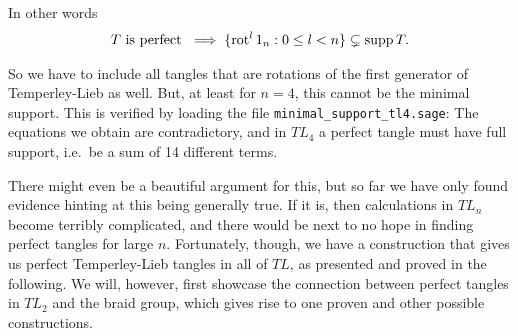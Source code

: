 In other words
\begin{align*}
T\text{ is perfect } \implies \{\operatorname{rot}^l 1_n : 0\leq l < n\}\subsetneq \operatorname{supp} T.
\end{align*}

So we have to include all tangles that are rotations of the first generator of Temperley-Lieb as well. But, at least for $n=4$, this cannot be the minimal support. This is verified by loading the file \texttt{minimal\_support\_tl4.sage}: The equations we obtain are contradictory, and in $TL_4$ a perfect tangle must have full support, i.e.\ be a sum of 14 different terms.

There might even be a beautiful argument for this, but so far we have only found evidence hinting at this being generally true. If it is, then calculations in $TL_n$ become terribly complicated, and there would be next to no hope in finding perfect tangles for large $n$. Fortunately, though, we have a construction that gives us perfect Temperley-Lieb tangles in all of $TL$, as presented and proved in the following. We will, however, first showcase the connection between perfect tangles in $TL_2$ and the braid group, which gives rise to one proven and other possible constructions.

